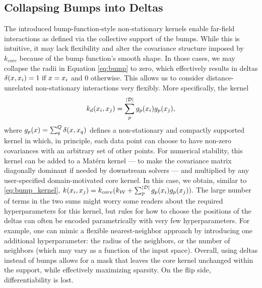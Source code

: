 \documentclass{article}
\renewcommand{\mathbf}[1]{%
  \ifx#1x x\else \textbf{#1}\fi
}
\begin{document}
\subsection{Collapsing Bumps into Deltas}
The introduced bump-function-style non-stationary kernels enable far-field interactions as defined via the collective support of the bumps. While this is intuitive, it may lack flexibility and alter the covariance structure imposed by $k_{core}$ because of the bump function's smooth shape. In those cases, we may collapse the radii in Equation \eqref{eq:bump} to zero, which effectively results in deltas $\delta(\mathbf{x},\mathbf{x}_i)=1 ~\text{if}~\mathbf{x}=\mathbf{x}_i$ and $0$ otherwise.
This allows us to consider distance-unrelated non-stationary interactions very flexibly. More specifically, the kernel
\vspace{-4mm}
\begin{equation} \label{eq:delta_kernel}
     k_{d}(\mathbf{x}_i,\mathbf{x}_j) = \sum_p^{|\mathcal{D}|} g_p(\mathbf{x}_i) g_p(\mathbf{x}_j),
     \vspace{-3mm}
\end{equation}
where $g_p(\mathbf{x}) = \sum_{q}^{Q} \delta(\mathbf{x}, \mathbf{x}_q)$ defines a non-stationary and compactly supported kernel in which, in principle, each data point can choose to have non-zero covariances with an arbitrary set of other points. For numerical stability, this kernel can be added to a Mat\'ern kernel --- to make the covariance matrix diagonally dominant if needed by downstream solvers --- and multiplied by any user-specified domain-motivated core kernel. In this case, we obtain, similar to \eqref{eq:bump_kernel},
$
    k(\mathbf{x}_i,\mathbf{x}_j) = k_{core}  (k_\mathcal{W} + \sum_p^{|\mathcal{D}|} g_p(\mathbf{x}_i) g_p(\mathbf{x}_j)).
$
The large number of terms in the two sums might worry some readers about the required hyperparameters for this kernel, but rules for how to choose the positions of the deltas can often be encoded parametrically with very few hyperparameters. For example, one can mimic a flexible nearest-neighbor approach by introducing one additional hyperparameter: the radius of the neighbors, or the number of neighbors (which may vary as a function of the input space). Overall, using deltas instead of bumps allows for a mask that leaves the core kernel unchanged within the support, while effectively maximizing sparsity. On the flip side, differentiability is lost.  
\end{document}
